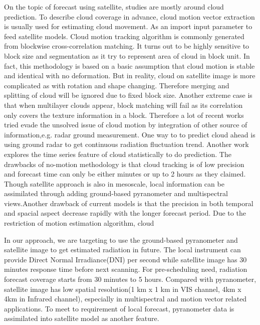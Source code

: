 \documentclass[conference]{IEEEtran}
\begin{document}
On the topic of forecast using satellite, studies are mostly around
cloud prediction. To describe cloud coverage in advance, cloud motion vector
extraction is usually used for estimating cloud movement. As an import input
parameter to feed satellite models. Cloud motion tracking algorithm is
commonly generated from blockwise cross-correlation
matching\cite{leese1970determination,heinemann2006forecasting}. It turns
out to be highly sensitive to block size and segmentation as it try to represent
area of cloud in block unit. In fact, this methodology is based on a basic assumption that cloud motion is stable and identical with no deformation. But in reality,
cloud on satellite image is more complicated as with rotation and shape
changing. Therefore merging and splitting of cloud will be ignored due to fixed
block size. Another extreme case is that when multilayer clouds appear, block
matching will fail as its correlation only covers the texture information in a
block. Therefore a lot of recent works tried evade the unsolved issue of cloud
motion by integration of other source of information,e.g. radar ground measurement.
One way to to predict cloud ahead is using ground radar to get continuous
radiation fluctuation trend\cite{gorsdorf2011cloud}. Another work
explores the time series feature of cloud statistically to do
prediction\cite{yang2012hourly}. The drawbacks of no-motion methodology is that
cloud tracking is of low precision and forecast time can only be either minutes or up to 2 hours as they claimed.
Though satellite approach is also in mesoscale, local information can be
assimilated through adding ground-based pyranometer and multispectral
views.Another drawback of current models is that the precision in
both temporal and spacial aspect decrease rapidly with the longer forecast
period. Due to the restriction of motion estimation algorithm, cloud 

In our approach, we are targeting to use the ground-based pyranometer and
satellite image to get estimated radiation in future. The local instrument
can provide Direct Normal Irradiance(DNI) per second while satellite image
has 30 minutes response time before next scanning. For pre-scheduling
need, radiation forecast coverage starts from 30 minutes to 5 hours. Compared
with pyranometer, satellite image has low spatial resolution(1 km x 1 km in VIS
channel, 4km x 4km in Infrared channel), especially in multispectral
and motion vector related applications. To meet to requirement of local
forecast, pyranometer data is assimilated into satellite model as another
feature. 
\end{document}
